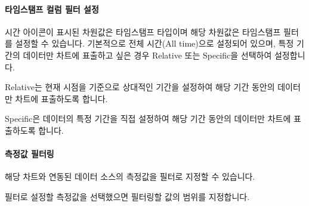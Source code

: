 \documentclass[letterpaper,10pt,english]{sphinxmanual}
\begin{document}
\paragraph{타임스탬프 컬럼 필터 설정}
\label{\detokenize{discovery/part04/chart_filter:id6}}
시간 아이콘이 표시된 차원값은 타임스탬프 타입이며 해당 차원값은 타임스탬프 필터를 설정할 수 있습니다. 기본적으로 전체 시간(All time)으로 설정되어 있으며, 특정 기간의 데이터만 차트에 표출하고 싶은 경우 Relative 또는 Specific을 선택하여 설정합니다.

Relative는 현재 시점을 기준으로 상대적인 기간을 설정하여 해당 기간 동안의 데이터만 차트에 표출하도록 합니다.
\begin{quote}

\begin{figure}[H]
\centering

\noindent{}
\end{figure}
\end{quote}

Specific은 데이터의 특정 기간을 직접 설정하여 해당 기간 동안의 데이터만 차트에 표출하도록 합니다.
\begin{quote}

\begin{figure}[H]
\centering

\noindent{}
\end{figure}
\end{quote}


\paragraph{측정값 필터링}
\label{\detokenize{discovery/part04/chart_filter:id7}}
해당 차트와 연동된 데이터 소스의 측정값을 필터로 지정할 수 있습니다.
\begin{quote}

\begin{figure}[H]
\centering

\noindent{}
\end{figure}
\end{quote}

필터로 설정할 측정값을 선택했으면 필터링할 값의 범위를 지정합니다.
\begin{quote}

\begin{figure}[H]
\centering

\noindent{}
\end{figure}
\end{quote}
\end{document}
